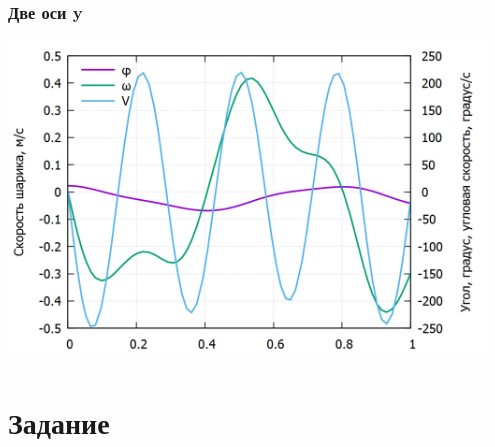 \documentclass[12pt, compress]{beamer}
\begin{document}
\begin{frame}[t,fragile]
\frametitle{Две оси y}
\includegraphics[width=0.95\textwidth]{./gp/secondary.png}
\end{frame}











\section{Задание}
\end{document}
